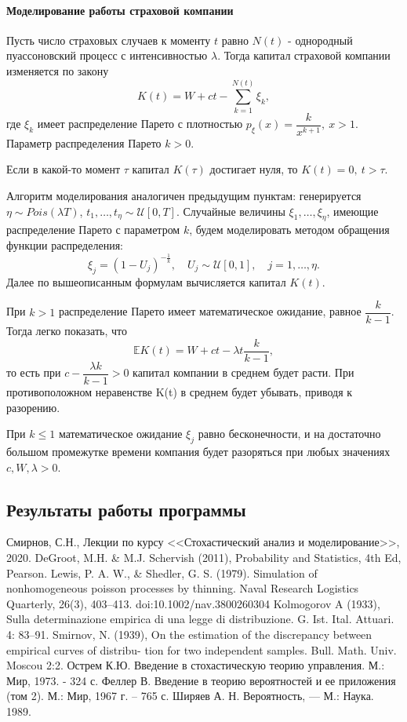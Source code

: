 \documentclass[16pt]{article}
\begin{document}
\paragraph{Моделирование работы страховой компании}
Пусть число страховых случаев к моменту $t$ равно $N(t)$ - однородный пуассоновский процесс с интенсивностью $\lambda$. Тогда капитал страховой компании изменяется по закону
$$K(t) = W + ct - \sum_{k=1}^{N(t)}\xi_k,$$
где $\xi_k$ имеет распределение Парето с плотностью $p_\xi(x) = \dfrac{k}{x^{k+1}}, \ x > 1$. Параметр распределения Парето $k > 0$.

Если в какой-то момент $\tau$ капитал $K(\tau)$ достигает нуля, то $K(t) = 0, \ t > \tau$.

Алгоритм моделирования аналогичен предыдущим пунктам: генерируется $\eta \sim Pois(\lambda T)$,
$t_1, \ldots, t_\eta \sim \mathcal{U}[0, T]$. Случайные величины $\xi_1, \ldots, \xi_\eta$, имеющие распределение Парето с параметром $k$, будем моделировать методом обращения функции распределения:
$$\xi_j = (1 - U_j)^{-\frac{1}{k}}, \quad U_j \sim \mathcal{U}[0, 1], \quad j = 1, \ldots, \eta.$$
Далее по вышеописанным формулам вычисляется капитал $K(t)$.

При $k > 1$ распределение Парето имеет математическое ожидание, равное $\dfrac{k}{k-1}$. Тогда легко показать, что 
$$\mathbb{E}K(t) = W + ct - \lambda t \dfrac{k}{k-1},$$
то есть при $c - \dfrac{\lambda k}{k-1} > 0$ капитал компании в среднем будет расти. При противоположном неравенстве K(t) в среднем будет убывать, приводя к разорению. 

При $k \leq 1$ математическое ожидание $\xi_j$ равно бесконечности, и на достаточно большом промежутке времени компания  будет разоряться при любых значениях $c, W, \lambda > 0$.
\subsection{Результаты работы программы}

\newpage
\center
\begin{thebibliography}{0}
Смирнов, С.Н., Лекции по курсу <<Стохастический анализ и моделирование>>, 2020.
DeGroot, M.H. \& M.J. Schervish (2011), Probability and Statistics, 4th Ed, Pearson.
Lewis, P. A. W., \& Shedler, G. S. (1979). Simulation of nonhomogeneous poisson processes by thinning. Naval Research Logistics Quarterly, 26(3), 403–413. doi:10.1002/nav.3800260304 
Kolmogorov A (1933), Sulla determinazione empirica di una legge di distribuzione. G. Ist. Ital. Attuari. 4: 83–91.
Smirnov, N. (1939), On the estimation of the discrepancy between empirical curves of distribu- tion for two independent samples. Bull. Math. Univ. Moscou 2:2. 
Острем К.Ю. Введение в стохастическую теорию управления. М.: Мир, 1973. - 324 с.
Феллер В. Введение в теорию вероятностей и ее приложения (том 2). М.: Мир, 1967 г. – 765 с.
Ширяев А. Н. Вероятность, — М.: Наука. 1989. 
\end{thebibliography}
\end{document}
